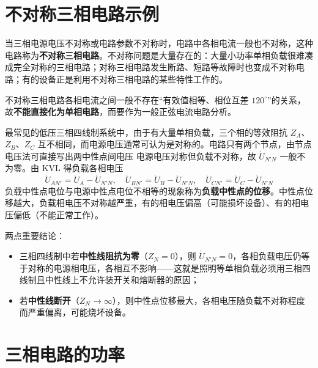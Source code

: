 
\section{不对称三相电路示例}
当三相电源电压不对称或电路参数不对称时，电路中各相电流一般也不对称，这种电路称为\textbf{不对称三相电路}。不对称问题是大量存在的：大量小功率单相负载很难凑成完全对称的三相电路；对称三相电路发生断路、短路等故障时也变成不对称电路；有的设备正是利用不对称三相电路的某些特性工作的。

不对称三相电路各相电流之间一般不存在“有效值相等、相位互差 $120^\circ$”的关系，故\textbf{不能直接化为单相电路}，而要作为一般正弦电流电路分析。

最常见的低压三相四线制系统中，由于有大量单相负载，三个相的等效阻抗 $Z_A$、$Z_B$、$Z_C$ 互不相同，而电源电压通常可认为是对称的。电路只有两个节点，由节点电压法可直接写出两中性点间电压
电源电压对称但负载不对称，故 $\dot{U}_{N'N}$ 一般不为零。由 KVL 得负载各相电压
\begin{equation}
\dot{U}_{AN'}=\dot{U}_A-\dot{U}_{N'N},\quad
\dot{U}_{BN'}=\dot{U}_B-\dot{U}_{N'N},\quad
\dot{U}_{CN'}=\dot{U}_C-\dot{U}_{N'N}
\end{equation}
负载中性点电位与电源中性点电位不相等的现象称为\textbf{负载中性点的位移}。中性点位移越大，负载相电压不对称越严重，有的相电压偏高（可能损坏设备）、有的相电压偏低（不能正常工作）。

两点重要结论：
\begin{itemize}
  \item 三相四线制中若\textbf{中性线阻抗为零}（$Z_N=0$），则 $\dot{U}_{N'N}=0$，各相负载电压仍等于对称的电源相电压，各相互不影响——这就是照明等单相负载必须用三相四线制且中性线上不允许装开关和熔断器的原因；
  \item 若\textbf{中性线断开}（$Z_N\to\infty$），则中性点位移最大，各相电压随负载不对称程度而严重偏离，可能烧坏设备。
\end{itemize}


\section{三相电路的功率}
